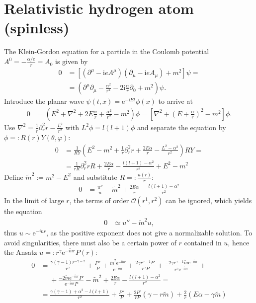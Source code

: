 \documentclass[english, parskip=full]{scrartcl}
\newcommand{\kla}{}
\newcommand{\klam}{}
\def\I{\text{i}}
\def\E{\text{e}}
\begin{document}
\section{Relativistic hydrogen atom (spinless)}
The Klein-Gordon equation for a particle in the Coulomb potential $A^0 =-\frac{\alpha/e}{r}=A_0$ is given by 
\begin{align*}
0&=\klam\left[ {\kla\left( {\partial^\mu -\I eA^\mu } \right)\kla\left( {\partial_\mu -\I eA_\mu } \right)+m^2} \right]\psi=\\
&=\kla\left( {\partial^\mu\partial_\mu-\frac{\alpha^2}{r^2}-2\I\frac{\alpha}{r}\partial_0+m^2} \right)\psi.
\end{align*}
Introduce the planar wave $\psi(t,x)=\E^{-\I E t}\phi(x)$ to arrive at
\begin{align*}
0&=\kla\left( {E^2+\nabla^2+2E\frac{\alpha}{r}+\frac{\alpha^2}{r^2}-m^2} \right)\phi=\klam\left[ {\nabla^2+\kla\left( {E +\frac{\alpha}{r}} \right)^2-m^2} \right]\phi.
\end{align*}
Use $\nabla^2=\frac{1}{r}\partial_r^2r-\frac{L^2}{r^2}$ with $L^2\phi=l(l+1)\phi$ and separate the equation by $\phi=:R(r)Y(\theta,\varphi)$:
\begin{align*}
0&=\frac{1}{RY}\kla\left( {E^2-m^2+\frac{1}{r}\partial_r^2r+\frac{2E\alpha}{r}-\frac{L^2-\alpha^2}{r^2}} \right)RY=\\
&=\frac{1}{rR}\partial_r^2rR+\frac{2E\alpha}{r}-\frac{l(l+1)-\alpha^2}{r^2}+E^2-m^2
\end{align*}
Define $\tilde{m}^2:=m^2-E^2$ and substitute $R=:\frac{u(r)}{r}$: %
\begin{align*}
0&=\frac{u''}{u}-\tilde{m}^2+\frac{2E\alpha}{r}-\frac{l(l+1)-\alpha^2}{r^2}
\end{align*}
In the limit of large $r$, the terms of order $\mathcal{O}(r^1,r^2)$ can be ignored, which yields the equation
\begin{align*}
0&\simeq u''-\tilde{m}^2u,
\end{align*}
thus $u\sim \E^{-\tilde{m}r}$, as the positive exponent does not give a normalizable solution. To avoid singularities, there must also be a certain power of $r$ contained in $u$, hence the Ansatz $u=:r^\gamma \E^{-\tilde{m}r}P(r)$:
\begin{align*}
0&=\frac{\gamma(\gamma-1)r^{-\gamma-2}}{r^\gamma}+\frac{P''}{P}+\frac{\tilde{m}^2\E^{-\tilde{m}r}}{\E^{-\tilde{m}r}}+\frac{2\gamma r^{\gamma-1}P'}{r^\gamma P}+\frac{-2\gamma r^{\gamma-1}\tilde{m}\E^{-\tilde{m}r}}{r^\gamma \E^{-\tilde{m}r}}+\\
&\ \ \ \ \ \ +\frac{-2\tilde{m}\E^{-\tilde{m}r}P'}{\E^{-\tilde{m}r}P}-\tilde{m}^2+\frac{2E\alpha}{r}-\frac{l(l+1)-\alpha^2}{r^2}=\\
&=\frac{\gamma(\gamma-1)+\alpha^2-l(l+1)}{r^2}+\frac{P''}{P}+\frac{2P'}{rP}(\gamma-r\tilde{m})+\frac{2}{r}(E\alpha-\gamma\tilde{m})
\end{align*}
\end{document}
